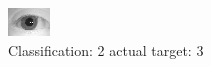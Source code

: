 \begin{figure}[h!]
\begin{center}
\includegraphics[width=0.60\columnwidth]{figures/ID1098_class_2_target_3.png}
\end{center}
\caption{ Classification: 2 actual target: 3}
\label{fig:ID1098_class_2_target_3}
\end{figure}
